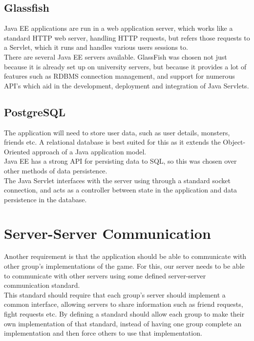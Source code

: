 \documentclass[a4paper]{article}
\begin{document}
\subsection{Glassfish}

Java EE applications are run in a web application server, which works like a standard HTTP web server, handling HTTP requests, but refers those requests to a Servlet, which it runs and handles various users sessions to.\\

There are several Java EE servers available. GlassFish was chosen not just because it is already set up on university servers, but because it provides a lot of features such as RDBMS connection management, and support for numerous API's which aid in the development, deployment and integration of Java Servlets.

\subsection{PostgreSQL}

The application will need to store user data, such as user details, monsters, friends etc.
A relational database is best suited for this as it extends the Object-Oriented approach of a Java application model.\\

Java EE has a strong API for persisting data to SQL, so this was chosen over other methods of data persistence.\\

The Java Servlet interfaces with the server using through a standard socket connection, and acts as a controller between state in the application and data persistence in the database.

\section{Server-Server Communication}

Another requirement is that the application should be able to communicate with other group's implementations of the game. For this, our server needs to be able to communicate with other servers using some defined server-server communication standard.\\

This standard should require that each group's server should implement a common interface, allowing servers to share information such as friend requests, fight requests etc. By defining a standard should allow each group to make their own implementation of that standard, instead of having one group complete an implementation and then force others to use that implementation.\\
\end{document}
